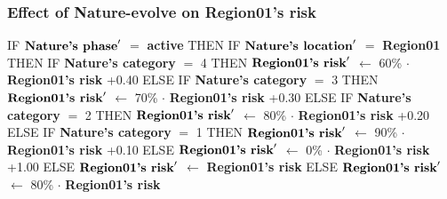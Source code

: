 \documentclass{article}%
\begin{document}
\subsubsection{Effect of Nature{-}evolve on Region01's risk}%
\label{ssubsec:Effect of Nature{-}evolve on Region01's risk}%
\begin{flushleft}%
IF %
$\mbox{\textbf{Nature's phase}} '$%
$=$%
\textbf{active}%
\linebreak%
\hspace*{2em}%
THEN %
IF %
$\mbox{\textbf{Nature's location}} '$%
$=$%
\textbf{Region01}%
\linebreak%
\hspace*{4em}%
THEN %
IF %
\textbf{Nature's category}%
$=$%
4%
\linebreak%
\hspace*{6em}%
THEN %
$\mbox{\textbf{Region01's risk}} '$%
$\leftarrow$%
60\%%
$\cdot$%
\textbf{Region01's risk}%
+0.40%
\linebreak%
\hspace*{6em}%
ELSE %
IF %
\textbf{Nature's category}%
$=$%
3%
\linebreak%
\hspace*{8em}%
THEN %
$\mbox{\textbf{Region01's risk}} '$%
$\leftarrow$%
70\%%
$\cdot$%
\textbf{Region01's risk}%
+0.30%
\linebreak%
\hspace*{8em}%
ELSE %
IF %
\textbf{Nature's category}%
$=$%
2%
\linebreak%
\hspace*{10em}%
THEN %
$\mbox{\textbf{Region01's risk}} '$%
$\leftarrow$%
80\%%
$\cdot$%
\textbf{Region01's risk}%
+0.20%
\linebreak%
\hspace*{10em}%
ELSE %
IF %
\textbf{Nature's category}%
$=$%
1%
\linebreak%
\hspace*{12em}%
THEN %
$\mbox{\textbf{Region01's risk}} '$%
$\leftarrow$%
90\%%
$\cdot$%
\textbf{Region01's risk}%
+0.10%
\linebreak%
\hspace*{12em}%
ELSE %
$\mbox{\textbf{Region01's risk}} '$%
$\leftarrow$%
0\%%
$\cdot$%
\textbf{Region01's risk}%
+1.00%
\linebreak%
\hspace*{4em}%
ELSE %
$\mbox{\textbf{Region01's risk}} '$%
$\leftarrow$%
\textbf{Region01's risk}%
\linebreak%
\hspace*{2em}%
ELSE %
$\mbox{\textbf{Region01's risk}} '$%
$\leftarrow$%
80\%%
$\cdot$%
\textbf{Region01's risk}%
\end{flushleft}
\end{document}
